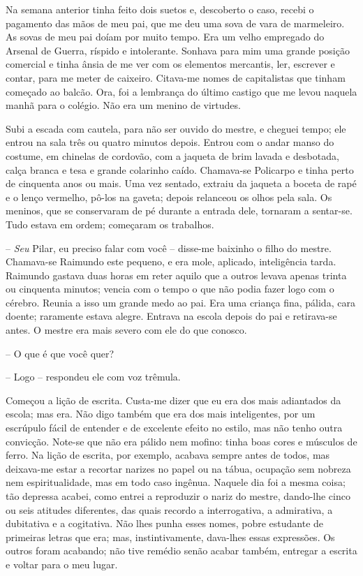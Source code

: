 Na semana anterior tinha feito dois suetos e, descoberto o caso, recebi
o pagamento das mãos de meu pai, que me deu uma sova de vara de
marmeleiro. As sovas de meu pai doíam por muito tempo. Era um velho
empregado do Arsenal de Guerra, ríspido e intolerante. Sonhava para mim
uma grande posição comercial e tinha ânsia de me ver com os elementos
mercantis, ler, escrever e contar, para me meter de caixeiro. Citava-me
nomes de capitalistas que tinham começado ao balcão. Ora, foi a
lembrança do último castigo que me levou naquela manhã para o colégio.
Não era um menino de virtudes.

Subi a escada com cautela, para não ser ouvido do mestre, e cheguei
tempo; ele entrou na sala três ou quatro minutos depois. Entrou com o
andar manso do costume, em chinelas de cordovão, com a jaqueta de brim
lavada e desbotada, calça branca e tesa e grande colarinho caído.
Chamava-se Policarpo e tinha perto de cinquenta anos ou mais. Uma vez
sentado, extraiu da jaqueta a boceta de rapé e o lenço vermelho, pô-los
na gaveta; depois relanceou os olhos pela sala. Os meninos, que se
conservaram de pé durante a entrada dele, tornaram a sentar-se. Tudo
estava em ordem; começaram os trabalhos.

-- \emph{Seu} Pilar, eu preciso falar com você -- disse-me baixinho o
filho do mestre. Chamava-se Raimundo este pequeno, e era mole, aplicado,
inteligência tarda. Raimundo gastava duas horas em reter aquilo que a
outros levava apenas trinta ou cinquenta minutos; vencia com o tempo o
que não podia fazer logo com o cérebro. Reunia a isso um grande medo ao
pai. Era uma criança fina, pálida, cara doente; raramente estava alegre.
Entrava na escola depois do pai e retirava-se antes. O mestre era mais
severo com ele do que conosco.

-- O que é que você quer?

-- Logo -- respondeu ele com voz trêmula.

Começou a lição de escrita. Custa-me dizer que eu era dos mais
adiantados da escola; mas era. Não digo também que era dos mais
inteligentes, por um escrúpulo fácil de entender e de excelente efeito
no estilo, mas não tenho outra convicção. Note-se que não era pálido nem
mofino: tinha boas cores e músculos de ferro. Na lição de escrita, por
exemplo, acabava sempre antes de todos, mas deixava-me estar a recortar
narizes no papel ou na tábua, ocupação sem nobreza nem espiritualidade,
mas em todo caso ingênua. Naquele dia foi a mesma coisa; tão depressa
acabei, como entrei a reproduzir o nariz do mestre, dando-lhe cinco ou
seis atitudes diferentes, das quais recordo a interrogativa, a
admirativa, a dubitativa e a cogitativa. Não lhes punha esses nomes,
pobre estudante de primeiras letras que era; mas, instintivamente,
dava-lhes essas expressões. Os outros foram acabando; não tive remédio
senão acabar também, entregar a escrita e voltar para o meu lugar.

